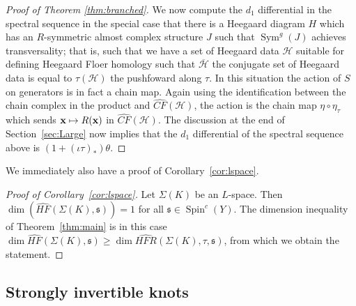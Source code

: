 \documentclass[11pt,reqno]{amsart}
\theoremstyle{definition}
\theoremstyle{remark}
\DeclareMathOperator{\Spin}{{Spin}}
\DeclareMathOperator{\Sym}{{Sym}}
\newcommand{\cH}{\mathcal{H}}
\newcommand{\CF}{\mathit{CF}}
\newcommand{\CFhat}{\widehat{\CF}}
\newcommand{\HF}{\mathit{HF}}
\newcommand{\HFR}{\mathit{HFR}}
\newcommand{\HFRhat}{\widehat{\HFR}}
\newcommand\HFhat{\widehat{\HF}}
\numberwithin{equation}{section}
\begin{document}
\begin{proof}[Proof of Theorem \ref{thm:branched}]
We now compute the $d_1$ differential in the spectral sequence in the special case that there is a Heegaard diagram $H$ which has an $R$-symmetric almost complex structure $J$ such that $\Sym^g(J)$ achieves transversality; that is, such that we have a set of Heegaard data $\cH$ suitable for defining Heegaard Floer homology such that $\overline{\cH}$ the conjugate set of Heegaard data is equal to $\tau (\cH)$ the pushfoward along $\tau$. In this situation the action of $S$ on generators is in fact a chain map. Again using the identification between the chain complex in the product and $\CFhat(\cH)$, the action is the chain map $\eta \circ \eta_{\tau}$ which sends ${\bf x} \mapsto R({\bf x})$ in $\CFhat(\cH)$. The discussion at the end of Section~\ref{sec:Large} now implies that the $d_1$ differential of the spectral sequence above is $(1+(\iota\tau)_*)\theta$. \end{proof}


We immediately also have a proof of Corollary~\ref{cor:lspace}.

\begin{proof}[Proof of Corollary~\ref{cor:lspace}] Let $\Sigma(K)$ be an $L$-space. Then $\dim(\HFhat(\Sigma(K), \mathfrak s)) = 1$ for all $\mathfrak s \in \Spin^c(Y)$. The dimension inequality of Theorem~\ref{thm:main} is in this case $\dim \HFhat(\Sigma(K), \mathfrak s) \geq \dim \HFRhat(\Sigma(K), \tau, \mathfrak s)$, from which we obtain the statement.
\end{proof}


\subsection{Strongly invertible knots} \label{sec:examples-knots}
\end{document}
